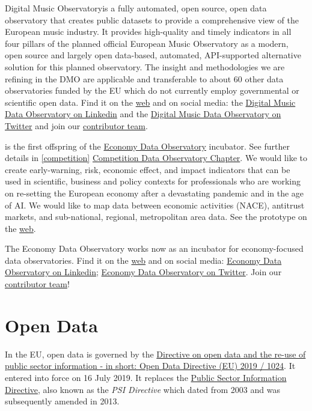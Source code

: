 \documentclass[
  a4paper,
  openany, a4paper, oneside]{book}
\begin{document}
Digital Music Observatoryis a fully automated, open source, open data observatory that creates public datasets to provide a comprehensive view of the European music industry. It provides high-quality and timely indicators in all four pillars of the planned official European Music Observatory as a modern, open source and largely open data-based, automated, API-supported alternative solution for this planned observatory. The insight and methodologies we are refining in the DMO are applicable and transferable to about 60 other data observatories funded by the EU which do not currently employ governmental or scientific open data. Find it on the \href{https://music.dataobservatory.eu/}{web} and on social media: the \href{https://www.linkedin.com/company/79286750/}{Digital Music Data Observatory on Linkedin} and the \href{https://twitter.com/DigitalMusicObs}{Digital Music Data Observatory on Twitter} and join our \href{https://music.dataobservatory.eu/\#contributors}{contributor team}.

is the first offspring of the \href{https://economy.dataobservatory.eu/}{Economy Data Observatory} incubator. See further details in \ref{competition} \protect\hyperlink{competition}{Competition Data Observatory Chapter}. We would like to create early-warning, risk, economic effect, and impact indicators that can be used in scientific, business and policy contexts for professionals who are working on re-setting the European economy after a devastating pandemic and in the age of AI. We would like to map data between economic activities (NACE), antitrust markets, and sub-national, regional, metropolitan area data. See the prototype on the \href{https://competition-data-observatory.netlify.app/}{web}.

The Economy Data Observatory works now as an incubator for economy-focused data observatories. Find it on the \href{https://economy.dataobservatory.eu/}{web} and on social media: \href{https://www.linkedin.com/company/78562153/}{Economy Data Observatory on Linkedin}; \href{https://twitter.com/EconDataObs/}{Economy Data Observatory on Twitter}. Join our \href{https://economy.dataobservatory.eu/\#contributors}{contributor team}!

\hypertarget{open-data}{%
\chapter{Open Data}\label{open-data}}

In the EU, open data is governed by the \href{https://eur-lex.europa.eu/legal-content/EN/TXT/?qid=1561563110433\&uri=CELEX:32019L1024}{Directive on open data and the re-use of public sector information - in short: Open Data Directive (EU) 2019 / 1024}. It entered into force on 16 July 2019. It replaces the \href{https://eur-lex.europa.eu/legal-content/en/ALL/?uri=CELEX:32003L0098}{Public Sector Information Directive}, also known as the \emph{PSI Directive} which dated from 2003 and was subsequently amended in 2013.
\end{document}
